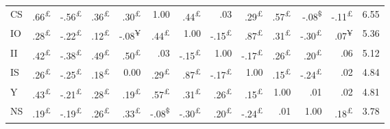 \documentclass{singlecol-new}
\theoremstyle{TH}{
\newtheorem{lemma}{Lemma}
\newtheorem{theorem}[lemma]{Theorem}
\newtheorem{corrolary}[lemma]{Corrolary}
\newtheorem{conjecture}[lemma]{Conjecture}
\newtheorem{proposition}[lemma]{Proposition}
\newtheorem{claim}[lemma]{Claim}
\newtheorem{stheorem}[lemma]{Wrong Theorem}
\newtheorem{algorithm}{Algorithm}
}
\theoremstyle{THrm}{
\newtheorem{definition}{Definition}[section]
\newtheorem{question}{Question}[section]
\newtheorem{remark}{Remark}
\newtheorem{scheme}{Scheme}
}
\theoremstyle{THhit}{
\newtheorem{case}{Case}[section]
}
\begin{document}
\begin{table*}[h!]
\begin{tabular}{lrrrrrrrrrrrr}
		CS & \cellcolor{gray!33}.66\textsuperscript{£} & \cellcolor{gray!28}-.56\textsuperscript{£} & \cellcolor{gray!18}.36\textsuperscript{£} & \cellcolor{gray!15}.30\textsuperscript{£} & \cellcolor{gray!50}1.00 & \cellcolor{gray!22}.44\textsuperscript{£} & \cellcolor{gray!02}.03 & \cellcolor{gray!14}.29\textsuperscript{£} & \cellcolor{gray!29}.57\textsuperscript{£} & \cellcolor{gray!04}-.08\textsuperscript{\$} & \cellcolor{gray!05}-.11\textsuperscript{£} & 6.55 \\
		IO & \cellcolor{gray!14}.28\textsuperscript{£} & \cellcolor{gray!11}-.22\textsuperscript{£} & \cellcolor{gray!06}.12\textsuperscript{£} & \cellcolor{gray!04}-.08\textsuperscript{¥} & \cellcolor{gray!22}.44\textsuperscript{£} & \cellcolor{gray!50}1.00 & \cellcolor{gray!07}-.15\textsuperscript{£} & \cellcolor{gray!44}.87\textsuperscript{£} & \cellcolor{gray!15}.31\textsuperscript{£} & \cellcolor{gray!15}-.30\textsuperscript{£} & \cellcolor{gray!04}.07\textsuperscript{¥} & 5.36 \\
		II & \cellcolor{gray!21}.42\textsuperscript{£} & \cellcolor{gray!19}-.38\textsuperscript{£} & \cellcolor{gray!24}.49\textsuperscript{£} & \cellcolor{gray!25}.50\textsuperscript{£} & \cellcolor{gray!02}.03 & \cellcolor{gray!07}-.15\textsuperscript{£} & \cellcolor{gray!50}1.00 & \cellcolor{gray!08}-.17\textsuperscript{£} & \cellcolor{gray!13}.26\textsuperscript{£} & \cellcolor{gray!10}.20\textsuperscript{£} & \cellcolor{gray!03}.06 & 5.12 \\
		IS & \cellcolor{gray!13}.26\textsuperscript{£} & \cellcolor{gray!13}-.25\textsuperscript{£} & \cellcolor{gray!09}.18\textsuperscript{£} & 0.00 & \cellcolor{gray!14}.29\textsuperscript{£} & \cellcolor{gray!44}.87\textsuperscript{£} & \cellcolor{gray!08}-.17\textsuperscript{£} & \cellcolor{gray!50}1.00 & \cellcolor{gray!07}.15\textsuperscript{£} & \cellcolor{gray!12}-.24\textsuperscript{£} & \cellcolor{gray!01}.02 & 4.84 \\
		Y & \cellcolor{gray!22}.43\textsuperscript{£} & \cellcolor{gray!10}-.21\textsuperscript{£} & \cellcolor{gray!14}.28\textsuperscript{£} & \cellcolor{gray!09}.19\textsuperscript{£} & \cellcolor{gray!29}.57\textsuperscript{£} & \cellcolor{gray!15}.31\textsuperscript{£} & \cellcolor{gray!13}.26\textsuperscript{£} & \cellcolor{gray!07}.15\textsuperscript{£} & \cellcolor{gray!50}1.00 & \cellcolor{gray!00}.01 & \cellcolor{gray!01}.02 & 4.81 \\
		NS & \cellcolor{gray!09}.19\textsuperscript{£} & \cellcolor{gray!09}-.19\textsuperscript{£} & \cellcolor{gray!13}.26\textsuperscript{£} & \cellcolor{gray!17}.33\textsuperscript{£} & \cellcolor{gray!04}-.08\textsuperscript{\$} & \cellcolor{gray!15}-.30\textsuperscript{£} & \cellcolor{gray!10}.20\textsuperscript{£} & \cellcolor{gray!12}-.24\textsuperscript{£} & \cellcolor{gray!00}.01 & \cellcolor{gray!50}1.00 & \cellcolor{gray!09}.18\textsuperscript{£} & 3.78 \\

\end{tabular}
\end{table*}
\end{document}
